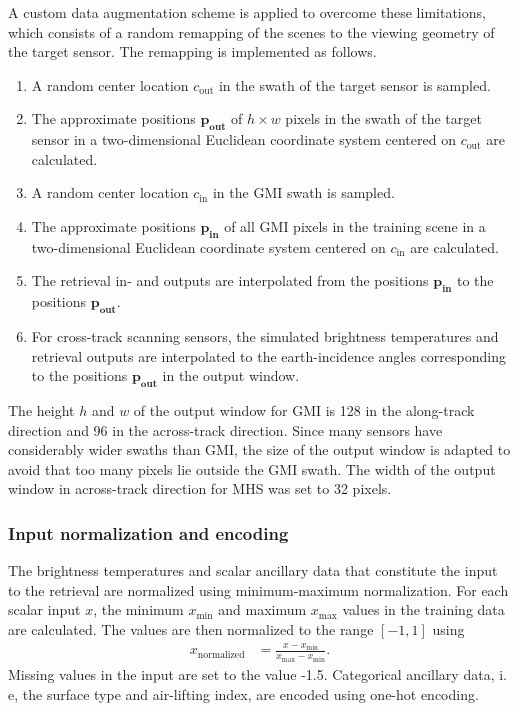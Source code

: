 \documentclass[journal abbreviation, manuscript]{copernicus}
\begin{document}
A custom data augmentation scheme is applied  to overcome these limitations, which
consists of a random remapping of the scenes  to the viewing
geometry of the target sensor. The remapping is implemented as follows.
\begin{enumerate}
\item A random center location $c_\text{out}$ in the swath of the target sensor is sampled.
\item The approximate positions $\mathbf{p_\text{out}}$ of $h \times w$ pixels
  in the swath of the target sensor  in a two-dimensional Euclidean coordinate system
  centered on $c_\text{out}$ are calculated.
\item A random center location $c_\text{in}$ in the GMI swath is sampled.
\item The approximate positions $\mathbf{p_\text{in}}$ of all GMI pixels in the
  training scene in a two-dimensional Euclidean coordinate system centered on
  $c_\text{in}$ are calculated.
\item The retrieval in- and outputs are interpolated from the
  positions $\mathbf{p_\text{in}}$ to the positions $\mathbf{p_\text{out}}$.
\item For cross-track scanning sensors, the simulated brightness temperatures and
  retrieval outputs are interpolated to the earth-incidence angles corresponding
  to the positions $\mathbf{p_\text{out}}$ in the output window.
\end{enumerate}

The height $h$ and $w$ of the output window for GMI is 128 in the along-track
direction and 96 in the across-track direction. Since many sensors have
considerably wider swaths than GMI, the size of the output window is adapted to
avoid that too many pixels lie outside the GMI swath. The width of the output
window in across-track direction for MHS was set to 32 pixels.

\subsubsection{Input normalization and encoding}
\label{sec:input_normalization}

The brightness temperatures and scalar ancillary data that constitute the input to the
retrieval are normalized using minimum-maximum
normalization. For each scalar input  $x$, the minimum $x_\text{min}$ and maximum
$x_\text{max}$ values in the training data are calculated. The values are then normalized to
the range $[-1, 1]$ using
\begin{align}
  x_\text{normalized} &= \frac{x - x_\text{min}}{x_\text{max} - x_\text{min}}.
\end{align}
Missing values in the input are set to the value -1.5. Categorical ancillary data, i. e,
the surface type and air-lifting index, are encoded using one-hot encoding.
\end{document}
